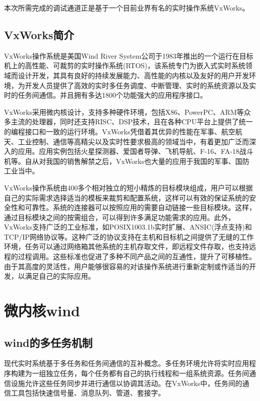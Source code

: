 本次所需完成的调试通道正是基于一个目前业界有名的实时操作系统VxWorks。

\subsection{VxWorks简介}
	VxWorks操作系统是美国Wind River System公司于1983年推出的一个运行在目标机上的高性能、可裁剪的实时操作系统(RTOS)，该系统专门为嵌入式实时系统领域而设计开发，其具有良好的持续发展能力、高性能的内核以及友好的用户开发环境，为开发人员提供了高效的实时多任务调度、中断管理、实时的系统资源以及实时的任务间通信。并且拥有多达1800个功能强大的应用程序接口\cite{嵌入式实时操作系统VxWorks及其开发环境Tornado}。
	
	VxWorks采用微内核设计，支持多种硬件环境，包括X86、PowerPC、ARM等众多主流的处理器，同时还支持RISC、DSP技术，且在各种CPU平台上提供了统一的编程接口和一致的运行环境。VxWorks凭借着其优异的性能在军事、航空航天、工业控制、通信等高精尖以及实时性要求极高的领域当中，有着更加广泛而深入的应用。应用实例包括火星探测器、爱国者导弹、飞机导航、F-16、FA-18战斗机等\cite{嵌入式实时操作系统VxWorks及其开发环境Tornado}。自从对我国的销售解禁之后，VxWorks也大量的应用于我国的军事、国防工业当中。
	
	VxWorks操作系统由400多个相对独立的短小精炼的目标模块组成，用户可以根据自己的实际需求选择适当的模板来裁剪和配置系统，这样可以有效的保证系统的安全性和可靠性。系统的连接器可以按照应用的需要自动链接一些目标模块。这样，通过目标模块之间的按需组合，可以得到许多满足功能需求的应用。此外，VxWorks支持广泛的工业标准，如POSIX1003.1b实时扩展、ANSIC(浮点支持)和TCP/IP网络协议等。这种广泛的协议支持在主机和目标机之间提供了无缝的工作环境，任务可以通过网络箱其他系统的主机存取文件，即远程文件存取，也支持远程的过程调用。这些标准也促进了多种不同产品之间的互通性，提升了可移植性。由于其高度的灵活性，用户能够很容易的对该操作系统进行重新定制或作适当的开发，以满足自己的实际应用。

\section{微内核wind}

\subsection{wind的多任务机制}
现代实时系统基于多任务和任务间通信的互补概念。多任务环境允许将实时应用程序构建为一组独立任务，每个任务都有自己的执行线程和一组系统资源。任务间通信设施允许这些任务同步并进行通信以协调其活动。在VxWorks中，任务间的通信工具包括快速信号量、消息队列、管道、套接字。


